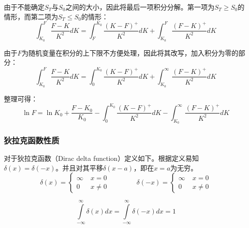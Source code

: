 \documentclass[11pt]{article}
\begin{document}
由于不能确定$S_T$与$S_0$之间的大小，因此将最后一项积分分解。第一项为$S_T \geq S_0$的情形，而第二项为$S_T \leq S_0$的情形：
\begin{equation*}
    \int^{F}_{K_0} \frac{F-K}{K^2} dK = \int^{K_0}_{F} \frac{(K-F)^+}{K^2} dK + \int^{F}_{K_0} \frac{(F-K)^+}{K^2} dK
\end{equation*}

由于$F$为随机变量在积分的上下限不方便处理，因此将其改写，加入积分为零的部分：
\begin{equation*}
    \int^{F}_{K_0} \frac{F-K}{K^2} dK = \int^{K_0}_{0} \frac{(K-F)^+}{K^2} dK + \int^{\infty}_{K_0} \frac{(F-K)^+}{K^2} dK 
\end{equation*}

整理可得：
\begin{equation*}
    \ln F = \ln K_0 + \frac{F-K_0}{K_0} - \int^{K_0}_{0} \frac{(K-F)^+}{K^2} dK - \int^{\infty}_{K_0} \frac{(F-K)^+}{K^2} dK 
\end{equation*}

\subsubsection{狄拉克\tops{$\delta$}函数性质}

对于狄拉克函数（Dirac delta function）定义如下。根据定义易知$\delta(x)=\delta(-x)$。并且对其平移$\delta(x-a)$，即在$x=a$为无穷。
\begin{equation*}
    \delta(x) =
    \begin{cases}
        \infty \;  &x=0 \\
        0 \; &x\neq 0
    \end{cases}
    \qquad\qquad
    \delta(-x) =
    \begin{cases}
        \infty \;  &x=0 \\
        0 \; &x\neq 0
    \end{cases}
\end{equation*}

\begin{corollary}
    \begin{equation*}
        \int\limits^{\infty}_{-\infty} \delta(x) dx =
        \int\limits^{\infty}_{-\infty} \delta(-x) dx = 1
    \end{equation*}
\end{corollary}
\end{document}
